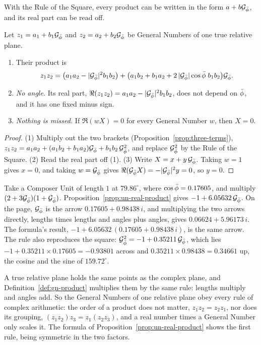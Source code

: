 With the Rule of the Square, every product can be written in the form $a + b\mathcal{G}_{\bar{\phi}}$, and its real part can be read off.

\begin{proposition}\label{prop:un-real-product}
Let $z_1 = a_1 + b_1\mathcal{G}_{\bar{\phi}}$ and $z_2 = a_2 + b_2\mathcal{G}_{\bar{\phi}}$ be General Numbers of one true relative plane.
\begin{enumerate}
  \item Their product is
  \[
  z_1 z_2 = \bigl(a_1 a_2 - |\mathcal{G}_{\bar{\phi}}|^2 b_1 b_2\bigr) + \bigl(a_1 b_2 + b_1 a_2 + 2\,|\mathcal{G}_{\bar{\phi}}|\cos\bar{\phi}\; b_1 b_2\bigr)\mathcal{G}_{\bar{\phi}} .
  \]
  \item \emph{No angle.} Its real part, $\Re(z_1 z_2) = a_1 a_2 - |\mathcal{G}_{\bar{\phi}}|^2 b_1 b_2$, does not depend on $\bar{\phi}$, and it has one fixed minus sign.
  \item \emph{Nothing is missed.} If $\Re(w X) = 0$ for every General Number $w$, then $X = 0$.
\end{enumerate}
\end{proposition}

\begin{proof}
(1) Multiply out the two brackets (Proposition~\ref{prop:three-terms}), $z_1 z_2 = a_1 a_2 + (a_1 b_2 + b_1 a_2)\mathcal{G}_{\bar{\phi}} + b_1 b_2\,\mathcal{G}_{\bar{\phi}}^2$, and replace $\mathcal{G}_{\bar{\phi}}^2$ by the Rule of the Square. (2) Read the real part off (1). (3) Write $X = x + y\,\mathcal{G}_{\bar{\phi}}$. Taking $w = 1$ gives $x = 0$, and taking $w = \mathcal{G}_{\bar{\phi}}$ gives $\Re(\mathcal{G}_{\bar{\phi}} X) = -|\mathcal{G}_{\bar{\phi}}|^2 y = 0$, so $y = 0$.
\end{proof}

\begin{workedexample}
Take a Composer Unit of length $1$ at $79.86^\circ$, where $\cos\bar{\phi} = 0.17605$, and multiply $(2 + 3\mathcal{G}_{\bar{\phi}})(1 + \mathcal{G}_{\bar{\phi}})$. Proposition~\ref{prop:un-real-product} gives $-1 + 6.05632\,\mathcal{G}_{\bar{\phi}}$. On the page, $\mathcal{G}_{\bar{\phi}}$ is the arrow $0.17605 + 0.98438\,i$, and multiplying the two arrows directly, lengths times lengths and angles plus angles, gives $0.06624 + 5.96173\,i$. The formula's result, $-1 + 6.05632\,(0.17605 + 0.98438\,i)$, is the same arrow. The rule also reproduces the square: $\mathcal{G}_{\bar{\phi}}^2 = -1 + 0.35211\,\mathcal{G}_{\bar{\phi}}$, which lies $-1 + 0.35211 \times 0.17605 = -0.93801$ across and $0.35211 \times 0.98438 = 0.34661$ up, the cosine and the sine of $159.72^\circ$.
\end{workedexample}

\begin{remark}\label{rem:un-rules}
A true relative plane holds the same points as the complex plane, and Definition~\ref{def:gn-product} multiplies them by the same rule: lengths multiply and angles add. So the General Numbers of one relative plane obey every rule of complex arithmetic: the order of a product does not matter, $z_1 z_2 = z_2 z_1$, nor does its grouping, $(z_1 z_2) z_3 = z_1 (z_2 z_3)$, and a real number times a General Number only scales it. The formula of Proposition~\ref{prop:un-real-product} shows the first rule, being symmetric in the two factors.
\end{remark}


